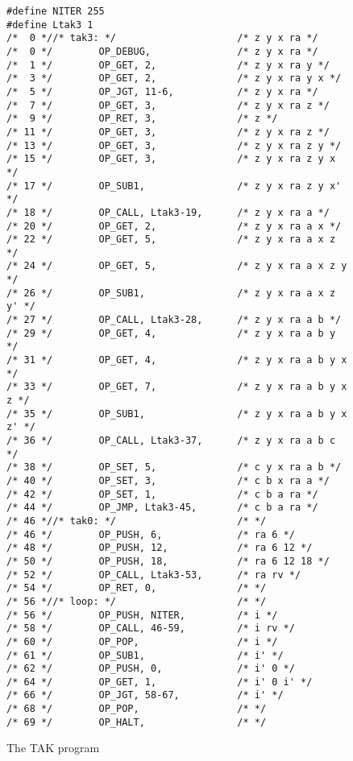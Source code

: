 \documentclass[10pt,a4paper]{article}
\begin{document}
\begin{figure}[p]
\begin{verbatim}
#define NITER 255
#define Ltak3 1
/*  0 *//* tak3: */                     /* z y x ra */
/*  0 */        OP_DEBUG,               /* z y x ra */
/*  1 */        OP_GET, 2,              /* z y x ra y */
/*  3 */        OP_GET, 2,              /* z y x ra y x */
/*  5 */        OP_JGT, 11-6,           /* z y x ra */
/*  7 */        OP_GET, 3,              /* z y x ra z */
/*  9 */        OP_RET, 3,              /* z */
/* 11 */        OP_GET, 3,              /* z y x ra z */
/* 13 */        OP_GET, 3,              /* z y x ra z y */
/* 15 */        OP_GET, 3,              /* z y x ra z y x */
/* 17 */        OP_SUB1,                /* z y x ra z y x' */
/* 18 */        OP_CALL, Ltak3-19,      /* z y x ra a */
/* 20 */        OP_GET, 2,              /* z y x ra a x */
/* 22 */        OP_GET, 5,              /* z y x ra a x z */
/* 24 */        OP_GET, 5,              /* z y x ra a x z y */
/* 26 */        OP_SUB1,                /* z y x ra a x z y' */
/* 27 */        OP_CALL, Ltak3-28,      /* z y x ra a b */
/* 29 */        OP_GET, 4,              /* z y x ra a b y */
/* 31 */        OP_GET, 4,              /* z y x ra a b y x */
/* 33 */        OP_GET, 7,              /* z y x ra a b y x z */
/* 35 */        OP_SUB1,                /* z y x ra a b y x z' */
/* 36 */        OP_CALL, Ltak3-37,      /* z y x ra a b c */
/* 38 */        OP_SET, 5,              /* c y x ra a b */
/* 40 */        OP_SET, 3,              /* c b x ra a */
/* 42 */        OP_SET, 1,              /* c b a ra */
/* 44 */        OP_JMP, Ltak3-45,       /* c b a ra */
/* 46 *//* tak0: */                     /* */
/* 46 */        OP_PUSH, 6,             /* ra 6 */
/* 48 */        OP_PUSH, 12,            /* ra 6 12 */
/* 50 */        OP_PUSH, 18,            /* ra 6 12 18 */
/* 52 */        OP_CALL, Ltak3-53,      /* ra rv */
/* 54 */        OP_RET, 0,              /* */
/* 56 *//* loop: */                     /* */
/* 56 */        OP_PUSH, NITER,         /* i */
/* 58 */        OP_CALL, 46-59,         /* i rv */
/* 60 */        OP_POP,                 /* i */
/* 61 */        OP_SUB1,                /* i' */
/* 62 */        OP_PUSH, 0,             /* i' 0 */
/* 64 */        OP_GET, 1,              /* i' 0 i' */
/* 66 */        OP_JGT, 58-67,          /* i' */
/* 68 */        OP_POP,                 /* */
/* 69 */        OP_HALT,                /* */
\end{verbatim}
\caption{The TAK program}
\label{fig:the-tak-program}
\end{figure}
\end{document}
